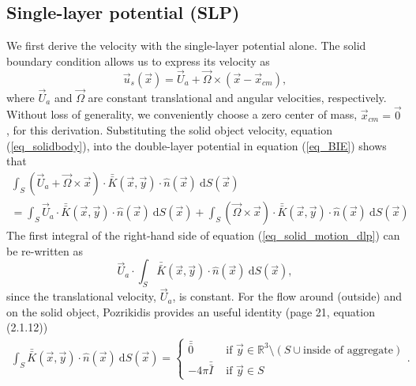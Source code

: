 \subsection{Single-layer potential (SLP)}
We first derive the velocity with the single-layer potential alone.
The solid boundary condition allows us to express its velocity as 
\begin{equation}
	\vec{u}_s \left( \vec{x} \right) 
	= \vec{U}_a + \vec{\Omega} \times \left( \vec{x} - \vec{x}_{cm} \right),
	\label{eq_solidbody}
\end{equation}
where $\vec{U}_a$ and $\vec{\Omega}$ are constant translational and angular velocities, respectively. Without loss of generality, we conveniently choose a zero center of mass, $\vec{x}_{cm} = \vec{0}$, for this derivation.
Substituting the solid object velocity, equation (\ref{eq_solidbody}), into the double-layer potential in equation (\ref{eq_BIE}) shows that 
\begin{align}
	\int_S
	\left( \vec{U}_a + \vec{\Omega} \times \vec{x} \right)
	 \cdot  \bar{\bar{K}}(\vec{x},\vec{y})  
	\cdot \hat{n} ( \vec{x})
	\ \text{d}S(\vec{x})
    \nonumber \\
	= 
	\int_S
	\vec{U}_a
	 \cdot  \bar{\bar{K}}(\vec{x},\vec{y})  
	\cdot \hat{n} ( \vec{x})
	\ \text{d}S(\vec{x})
     + 	
	\int_S
	\left(  \vec{\Omega} \times \vec{x} \right)
	 \cdot  \bar{\bar{K}}(\vec{x},\vec{y})  
	\cdot \hat{n} ( \vec{x})
	\ \text{d}S(\vec{x})
	\label{eq_solid_motion_dlp}
\end{align}
The first integral of the right-hand side of equation (\ref{eq_solid_motion_dlp}) can be re-written as 
\begin{equation}
	\vec{U}_a \cdot
	\int_S
	  \bar{\bar{K}}(\vec{x},\vec{y})  
	\cdot \hat{n} ( \vec{x})
	\ \text{d}S(\vec{x}),
	\label{eq_solid_motion_dlp_Ua}
\end{equation}
since the translational velocity, $\vec{U}_a$, is constant. 
For the flow around (outside) and on the solid object, Pozrikidis provides an useful identity \cite{pozrikidis_boundary_1992} (page 21, equation (2.1.12))
\begin{align}
	\int_S  \bar{\bar{K}}(\vec{x},\vec{y}) \cdot \hat{n} ( \vec{x})
	\ \text{d}S(\vec{x})
	=
	 \begin{cases}
	 \bar{\bar{0}} & \text{ if } \vec{y} \in \mathbb{R}^3  \setminus  \left( S \cup {\text{inside of aggregate}}\right) 	\\ 
	 - 4\pi \bar{\bar{I}} & \text{ if } \vec{y} \in S 
	 \end{cases}.
	\label{eq_dlp_identity1}
\end{align}
